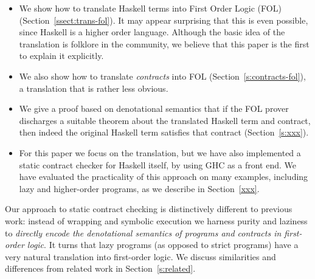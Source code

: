 \begin{itemize}
\item We show how to translate Haskell terms
into First Order Logic (FOL) (Section~\ref{ssect:trans-fol}).  
It may appear surprising that this 
is even possible, since Haskell is a higher order language.  Although
the basic idea of the translation is folklore in the community,
we believe that this paper is the first to explain it explicitly.

\item We also show how to translate \emph{contracts} into FOL
      (Section~\ref{s:contracts-fol}), 
      a translation that is rather less obvious.

\item We give a proof based on denotational semantics 
that if the FOL prover discharges a 
suitable theorem about the translated Haskell term and contract, 
then indeed the original Haskell term satisfies that contract (Section~\ref{s:xxx}).


\item For this paper we focus on the
translation, but we have also implemented a static contract checker
for Haskell itself, by using GHC as a front end.  We have evaluated
the practicality of this approach on many examples, including lazy and
higher-order programs, as we describe in Section~\ref{xxx}.  
\end{itemize}

Our approach to static contract checking is distinctively different to
previous work: instead of wrapping and symbolic execution we harness
purity and laziness to \emph{directly encode the denotational semantics of programs
and contracts in first-order logic}. It turns that lazy programs (as opposed to
strict programs) have a very natural translation into first-order logic.
We discuss similarities and differences from
related work in Section~\ref{s:related}.


















